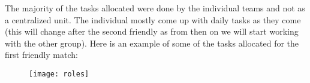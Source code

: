 The majority of the tasks allocated were done by the individual teams and not as a centralized unit. The individual mostly come up with daily tasks as they come (this will change after the second friendly as from then on we will start working with the other group). Here is an example of some of the tasks allocated for the first friendly match:

\begin{figure}[H]
    \centering
    \texttt{[image: roles]}
    \label{fig:networkdiagram}
\end{figure}

